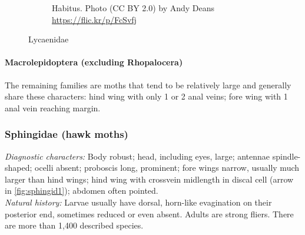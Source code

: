 \documentclass[letterpaper, 11pt]{article}
\begin{document}
\begin{figure}[ht!]
\begin{subfigure}[ht!]{0.5\textwidth}
        \caption{Habitus. Photo (CC BY 2.0) by Andy Deans \url{https://flic.kr/p/FcSvfj}}
        \label{fig:lycaenid2}
    \end{subfigure}
    \caption{Lycaenidae}\label{fig:lycaenids}
\end{figure}

\paragraph{Macrolepidoptera (excluding Rhopalocera)} The remaining families are moths that tend to be relatively large and generally share these characters: hind wing with only 1 or 2 anal veins; fore wing with 1 anal vein reaching margin.\\

\subsubsection{Sphingidae (hawk moths)}
\noindent{}\textit{Diagnostic characters:} Body robust; head, including eyes, large; antennae spindle-shaped; ocelli absent; proboscis long, prominent; fore wings narrow, usually much larger than hind wings; hind wing with crossvein midlength in discal cell (arrow in \ref{fig:sphingid1}); abdomen often pointed.\\

\noindent{}\textit{Natural history:} Larvae usually have dorsal, horn-like evagination on their posterior end, sometimes reduced or even absent. Adults are strong fliers. There are more than 1,400 described species.
\end{document}
